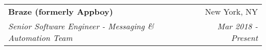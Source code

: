 \documentclass[letterpaper,10pt]{article}
\makeatletter
\newcommand{\resumeItem}[2]{
  \item\small{
    \textbf{#1}{: #2 \vspace{-2pt}}
  }
}
\newcommand{\resumeSubheading}[4]{
  \vspace{-1pt}\item
    \begin{tabular*}{0.97\textwidth}{l@{\extracolsep{\fill}}r}
      \textbf{#1} & #2 \\
      \textit{\small#3} & \textit{\small #4} \\
    \end{tabular*}\vspace{-5pt}
}
\newcommand{\resumeItemListStart}{\begin{itemize}}
\newcommand{\resumeItemListEnd}{\end{itemize}\vspace{-5pt}}
\makeatother
\begin{document}
    \resumeSubheading
      {Braze (formerly Appboy)}{New York, NY}
      {Senior Software Engineer - Messaging \& Automation Team}{Mar 2018 - Present}
\end{document}
